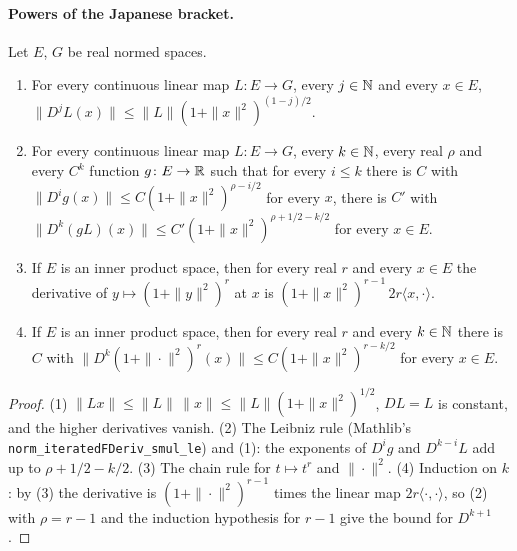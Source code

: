 \paragraph{Powers of the Japanese bracket.}

\begin{lemma}
\label{lem:bracket-power-derivatives}
\leanok
Let $E$, $G$ be real normed spaces.
\begin{enumerate}
  \item For every continuous linear map $L \colon E \to G$, every $j \in \mathbb{N}$ and every
    $x \in E$, $\|D^j L(x)\| \leq \|L\| (1 + \|x\|^2)^{(1-j)/2}$.
  \item For every continuous linear map $L \colon E \to G$, every $k \in \mathbb{N}$, every real $\rho$
    and every $C^k$ function $g \colon E \to \mathbb{R}$ such that for every $i \leq k$ there is $C$
    with $\|D^i g(x)\| \leq C (1 + \|x\|^2)^{\rho - i/2}$ for every $x$, there is $C'$ with
    $\|D^k (g L)(x)\| \leq C' (1 + \|x\|^2)^{\rho + 1/2 - k/2}$ for every $x \in E$.
  \item If $E$ is an inner product space, then for every real $r$ and every $x \in E$ the
    derivative of $y \mapsto (1 + \|y\|^2)^r$ at $x$ is
    $(1 + \|x\|^2)^{r-1} \, 2r \langle x, \cdot \rangle$.
  \item If $E$ is an inner product space, then for every real $r$ and every $k \in \mathbb{N}$ there is
    $C$ with $\|D^k (1 + \|\cdot\|^2)^r(x)\| \leq C (1 + \|x\|^2)^{r - k/2}$ for every $x \in E$.
\end{enumerate}
\end{lemma}

\begin{proof}
\leanok
(1) $\|L x\| \leq \|L\| \, \|x\| \leq \|L\| (1 + \|x\|^2)^{1/2}$, $D L = L$ is constant, and the
higher derivatives vanish. (2) The Leibniz rule (Mathlib's
\texttt{norm\_\allowbreak iteratedFDeriv\_\allowbreak smul\_\allowbreak le}) and (1): the
exponents of $D^i g$ and $D^{k-i} L$ add up to $\rho + 1/2 - k/2$. (3) The chain rule for
$t \mapsto t^r$ and $\|\cdot\|^2$. (4) Induction on $k$: by (3) the derivative is
$(1 + \|\cdot\|^2)^{r-1}$ times the linear map $2r \langle \cdot, \cdot \rangle$, so (2) with
$\rho = r - 1$ and the induction hypothesis for $r - 1$ give the bound for $D^{k+1}$.
\end{proof}

